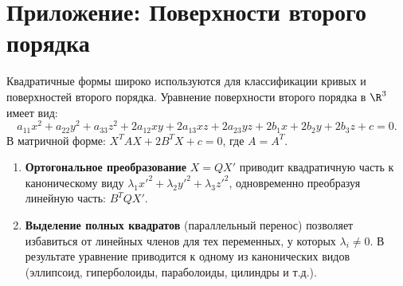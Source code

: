\documentclass[12pt]{article}
\begin{document}
\section*{Приложение: Поверхности второго порядка}
Квадратичные формы широко используются для классификации кривых и поверхностей второго порядка. Уравнение поверхности второго порядка в $\R^3$ имеет вид:
\[
a_{11}x^2 + a_{22}y^2 + a_{33}z^2 + 2a_{12}xy + 2a_{13}xz + 2a_{23}yz + 2b_1x + 2b_2y + 2b_3z + c = 0.
\]
В матричной форме: $X^T A X + 2B^T X + c = 0$, где $A = A^T$.

\begin{enumerate}
    \item \textbf{Ортогональное преобразование} $X = QX'$ приводит квадратичную часть к каноническому виду $\lambda_1 x'^2 + \lambda_2 y'^2 + \lambda_3 z'^2$, одновременно преобразуя линейную часть: $B^T Q X'$.
    \item \textbf{Выделение полных квадратов} (параллельный перенос) позволяет избавиться от линейных членов для тех переменных, у которых $\lambda_i \neq 0$. В результате уравнение приводится к одному из канонических видов (эллипсоид, гиперболоиды, параболоиды, цилиндры и т.д.).
\end{enumerate}
\end{document}
